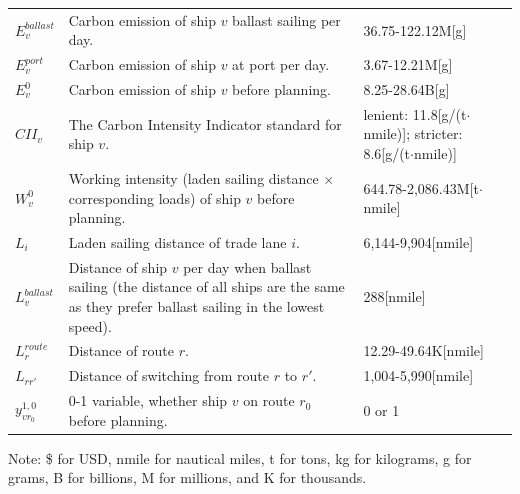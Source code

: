\documentclass[11pt,english]{article}
\begin{document}
\begin{table}[htbp]
\begin{tabular}{@{}lp{10cm}p{4.3cm}}
$E_v^{ballast}$ & Carbon emission of ship $v$ ballast sailing per day. & 36.75-122.12M[g] \\
$E_v^{port}$ & Carbon emission of ship $v$ at port per day. & 3.67-12.21M[g]\\
$E_v^0$ & Carbon emission of ship $v$ before planning. & 8.25-28.64B[g]\\
$CII_v$ & The Carbon Intensity Indicator standard for ship $v$. & lenient: 11.8[g/(t$\cdot$nmile)]; stricter: 8.6[g/(t$\cdot$nmile)]\\
$W_v^0$ & Working intensity (laden sailing distance $\times$ corresponding loads) of ship $v$ before planning. & 644.78-2,086.43M[t$\cdot$ nmile]\\
$L_i$ & Laden sailing distance of trade lane $i$. & 6,144-9,904[nmile] \\
$L_v^{ballast}$ & Distance of ship $v$ per day when ballast sailing (the distance of all ships are the same as they prefer ballast sailing in the lowest speed). & 288[nmile] \\
$L_r^{route}$ & Distance of route $r$. & 12.29-49.64K[nmile] \\
$L_{rr'}$ & Distance of switching from route $r$ to $r'$. & 1,004-5,990[nmile] \\
$y_{vr_0}^{1,0}$ &0-1 variable, whether ship $v$ on route $r_0$ before planning. & 0 or 1 \\
\bottomrule
\end{tabular}
\begin{tablenotes}
    \item Note: \$ for USD, nmile for nautical miles, t for tons, kg for kilograms, g for grams, B for billions, M for millions, and K for thousands.
 \end{tablenotes}
\end{table}
\end{document}
